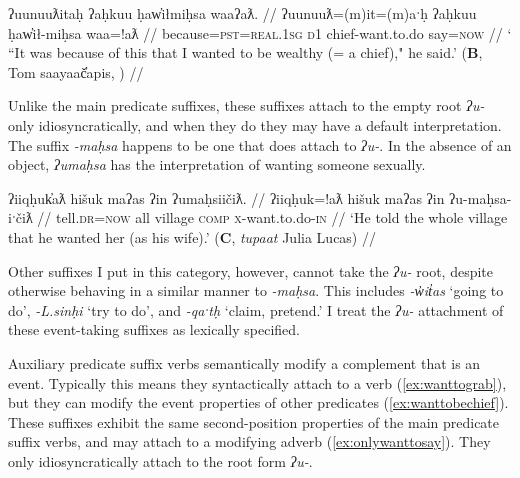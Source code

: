 \begin{comment}
EMB points out that below "want to" is attaching to causative

\ex \label{ex:wanttomakestrong}
\begingl
\glpreamble ʔunʔuuƛḥwaʔišʔaał ʔin ḥaaʔakmaḥsapsuuk m̓aam̓iiqsu. //
\gla ʔunʔuuƛ-(q)ḥ=waˑʔiš=ʔaał ʔin ḥaaʔak-maḥsa=!ap=suuk m̓aam̓iiqsu //
\glb because-\textsc{link}=\textsc{hrsy.3}=\textsc{habit} \textsc{comp} strong-want.to.do=\textsc{caus}=\textsc{neut.2pl} older.sibling //
\glft `It's because you want to make your older sibling strong.' (\textbf{C}, \textit{tupaat} Julia Lucas) //
\endgl
\xe
\end{comment}

\ex \label{ex:wanttobechief}
\begingl
\glpreamble ʔuunuuƛitaḥ ʔaḥkuu ḥaw̓iłmiḥsa waaʔaƛ. //
\gla ʔuunuuƛ=(m)it=(m)aˑḥ ʔaḥkuu ḥaw̓ił-miḥsa waa=!aƛ //
\glb because=\textsc{pst}=\textsc{real.1sg} \textsc{d1} chief-want.to.do say=\textsc{now} //
\glft ` ``It was because of this that I wanted to be wealthy (= a chief)," he said.' (\textbf{B}, Tom saayaač̓apis, \citet[p.~25]{sapir1955}) //
\endgl
\xe

Unlike the main predicate suffixes, these suffixes attach to the empty root \textit{ʔu-} only idiosyncratically, and when they do they may have a default interpretation. The suffix \textit{-maḥsa} happens to be one that does attach to \textit{ʔu-}. In the absence of an object, \textit{ʔumaḥsa} has the interpretation of wanting someone sexually.

\ex \label{ex:wanttomarry}
\begingl
\glpreamble ʔiiqḥuk̓aƛ hišuk maʔas ʔin ʔumaḥsiičiƛ. //
\gla ʔiiqḥuk=!aƛ hišuk maʔas ʔin ʔu-maḥsa-iˑčiƛ //
\glb tell.\textsc{dr}=\textsc{now} all village \textsc{comp} \textsc{x}-want.to.do-\textsc{in} //
\glft `He told the whole village that he wanted her (as his wife).' (\textbf{C}, \textit{tupaat} Julia Lucas) //
\endgl
\xe

Other suffixes I put in this category, however, cannot take the \textit{ʔu-} root, despite otherwise behaving in a similar manner to \textit{-maḥsa}. This includes \textit{-w̓it̓as} `going to do', \textit{-L.sinḥi} `try to do', and \textit{-qaˑtḥ} `claim, pretend.' I treat the \textit{ʔu-} attachment of these event-taking suffixes as lexically specified.

Auxiliary predicate suffix verbs semantically modify a complement that is an event. Typically this means they syntactically attach to a verb (\ref{ex:wanttograb}), but they can modify the event properties of other predicates (\ref{ex:wanttobechief}). These suffixes exhibit the same second-position properties of the main predicate suffix verbs, and may attach to a modifying adverb (\ref{ex:onlywanttosay}). They only idiosyncratically attach to the root form \textit{ʔu-}.

